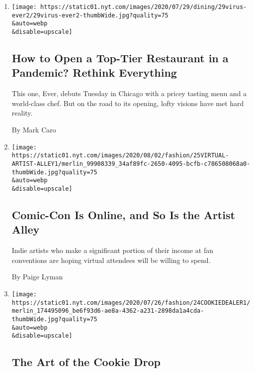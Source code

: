\begin{enumerate}
\def\labelenumi{\arabic{enumi}.}
\item
  \href{/2020/07/28/dining/ever-chicago-restaurant-coronavirus.html}{}

  \texttt{[image: https://static01.nyt.com/images/2020/07/29/dining/29virus-ever2/29virus-ever2-thumbWide.jpg?quality=75\\\&auto=webp\\\&disable=upscale]}

  \hypertarget{how-to-open-a-top-tier-restaurant-in-a-pandemic-rethink-everything}{%
  \subsection{How to Open a Top-Tier Restaurant in a Pandemic? Rethink
  Everything}\label{how-to-open-a-top-tier-restaurant-in-a-pandemic-rethink-everything}}

  This one, Ever, debuts Tuesday in Chicago with a pricey tasting menu
  and a world-class chef. But on the road to its opening, lofty visions
  have met hard reality.

  By Mark Caro
\item
  \href{/2020/07/25/style/comic-con-online-artist-alley.html}{}

  \texttt{[image: https://static01.nyt.com/images/2020/08/02/fashion/25VIRTUAL-ARTIST-ALLEY1/merlin\_99908339\_34af89fc-2650-4095-bcfb-c786508068a0-thumbWide.jpg?quality=75\\\&auto=webp\\\&disable=upscale]}

  \hypertarget{comic-con-is-online-and-so-is-the-artist-alley}{%
  \subsection{Comic-Con Is Online, and So Is the Artist
  Alley}\label{comic-con-is-online-and-so-is-the-artist-alley}}

  Indie artists who make a significant portion of their income at fan
  conventions are hoping virtual attendees will be willing to spend.

  By Paige Lyman
\item
  \href{/2020/07/24/style/my-cookie-dealer-instagram.html}{}

  \texttt{[image: https://static01.nyt.com/images/2020/07/26/fashion/24COOKIEDEALER1/merlin\_174495096\_be6f93d6-ae8a-4362-a231-2898da1a4cda-thumbWide.jpg?quality=75\\\&auto=webp\\\&disable=upscale]}

  \hypertarget{the-art-of-the-cookie-drop}{%
  \subsection{The Art of the Cookie
  Drop}\label{the-art-of-the-cookie-drop}}


\end{enumerate}
